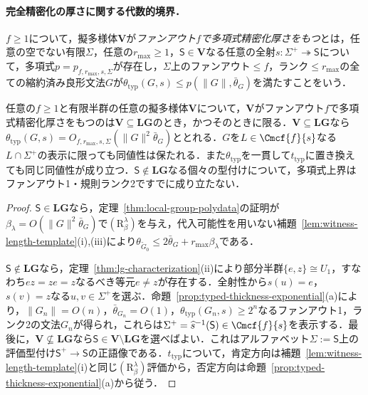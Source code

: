 \paragraph{完全精密化の厚さに関する代数的境界．}
$f\ge1$について，擬多様体$\mathbf V$が\emph{ファンアウト$f$で多項式精密化厚さをもつ}とは，任意の空でない有限$\Sigma$，任意の$r_{\max}\ge1$，$\mathsf S\in\mathbf V$なる任意の全射$s:\Sigma^+\twoheadrightarrow\mathsf S$について，多項式$p=p_{f,r_{\max},s,\Sigma}$が存在し，$\Sigma$上のファンアウト$\le f$，ランク$\le r_{\max}$の全ての縮約済み良形文法$G$が$\theta_{\mathrm{typ}}(G,s)\le p(\|G\|,\bar\theta_G)$を満たすことをいう．

\begin{corollary}[精密化厚さの二分法]
\label{cor:refinement-dichotomy}
任意の$f\ge1$と有限半群の任意の擬多様体$\mathbf V$について，$\mathbf V$がファンアウト$f$で多項式精密化厚さをもつのは$\mathbf V\subseteq\mathbf{LG}$のとき，かつそのときに限る．$\mathbf V\subseteq\mathbf{LG}$なら$\theta_{\mathrm{typ}}(G,s)=O_{f,r_{\max},s,\Sigma}(\|G\|^2\bar\theta_G)$ととれる．$G$を$L\in\Cmcf{f}{s}$なる$L\cap\Sigma^+$の表示に限っても同値性は保たれる．また$\theta_{\mathrm{typ}}$を一貫して$t_{\mathrm{typ}}$に置き換えても同じ同値性が成り立つ．$\mathsf S\notin\mathbf{LG}$なる個々の型付けについて，多項式上界はファンアウト1・規則ランク2ですでに成り立たない．
\end{corollary}

\begin{proof}
$\mathsf S\in\mathbf{LG}$なら，定理~\ref{thm:local-group-polydata}の証明が$\beta_\lambda=O(\|G\|^2\bar\theta_G)$で$(\mathrm R_\beta^\lambda)$を与え，代入可能性を用いない補題~\ref{lem:witness-length-template}(i),(iii)により$\theta_{\widetilde G_0}\le2\bar\theta_G+r_{\max}\beta_\lambda$である．

$\mathsf S\notin\mathbf{LG}$なら，定理~\ref{thm:lg-characterization}(ii)により部分半群$\{e,z\}\cong U_1$，すなわち$ez=ze=z$なるべき等元$e\ne z$が存在する．全射性から$s(u)=e$，$s(v)=z$なる$u,v\in\Sigma^+$を選ぶ．命題~\ref{prop:typed-thickness-exponential}(a)により，$\|G_n\|=O(n)$，$\bar\theta_{G_n}=O(1)$，$\theta_{\mathrm{typ}}(G_n,s)\ge2^n$なるファンアウト1，ランク2の文法$G_n$が得られ，これらは$\Sigma^+=\widehat s^{-1}(\mathsf S)\in\Cmcf{f}{s}$を表示する．最後に，$\mathbf V\not\subseteq\mathbf{LG}$なら$\mathsf S\in\mathbf V\setminus\mathbf{LG}$を選べばよい．これはアルファベット$\Sigma:=\mathsf S$上の評価型付け$\mathsf S^+\to\mathsf S$の正語像である．$t_{\mathrm{typ}}$について，肯定方向は補題~\ref{lem:witness-length-template}(i)と同じ$(\mathrm R_\beta^\lambda)$評価から，否定方向は命題~\ref{prop:typed-thickness-exponential}(a)から従う．
\end{proof}

